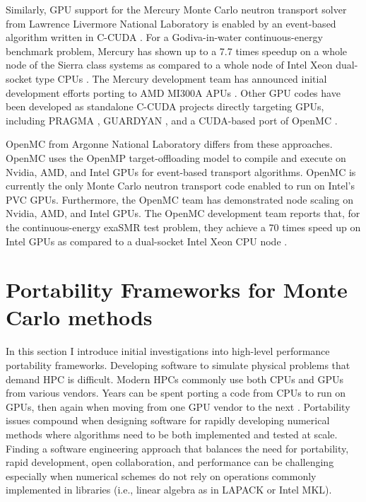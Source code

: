 Similarly, GPU support for the Mercury Monte Carlo neutron transport solver from Lawrence Livermore National Laboratory is enabled by an event-based algorithm written in C-CUDA \cite{pozulp_progress_2023, pozulp_sna_2024}.
For a Godiva-in-water continuous-energy benchmark problem, Mercury has shown up to a 7.7 times speedup on a whole node of the Sierra class systems as compared to a whole node of Intel Xeon dual-socket type CPUs \cite{pozulp_progress_2023}.
The Mercury development team has announced initial development efforts porting to AMD MI300A APUs \cite{pozulp_sna_2024}.
Other GPU codes have been developed as standalone C-CUDA projects directly targeting GPUs, including PRAGMA \cite{choi_optimization_2021}, GUARDYAN \cite{molnar_gpu_based_2019}, and a CUDA-based port of OpenMC \cite{ridley2021}.

OpenMC from Argonne National Laboratory differs from these approaches.
OpenMC uses the OpenMP target-offloading model to compile and execute on Nvidia, AMD, and Intel GPUs for event-based transport algorithms.
OpenMC is currently the only Monte Carlo neutron transport code enabled to run on Intel's PVC GPUs.
Furthermore, the OpenMC team has demonstrated node scaling on Nvidia, AMD, and Intel GPUs.
The OpenMC development team reports that, for the continuous-energy exaSMR test problem, they achieve a 70 times speed up on Intel GPUs as compared to a dual-socket Intel Xeon CPU node \cite{tramm2024performanceportablemontecarlo}.


\section{Portability Frameworks for Monte Carlo methods}

In this section I introduce initial investigations into high-level performance portability frameworks.
Developing software to simulate physical problems that demand HPC is difficult.
Modern HPCs commonly use both CPUs and GPUs from various vendors.
Years can be spent porting a code from CPUs to run on GPUs, then again when moving from one GPU vendor to the next \cite{pozulp_progress_2023}.
Portability issues compound when designing software for rapidly developing numerical methods where algorithms need to be both implemented and tested at scale.
Finding a software engineering approach that balances the need for portability, rapid development, open collaboration, and performance can be challenging especially when numerical schemes do not rely on operations commonly implemented in libraries  (i.e., linear algebra as in LAPACK or Intel MKL). 

